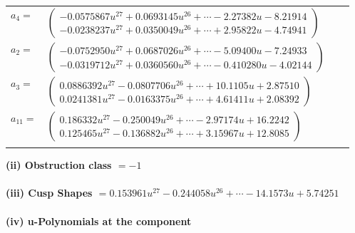 \documentclass[1p]{elsarticle_modified}
\theoremstyle{definition}
\begin{document}
\begin{tabular}{m{7pt} m{180pt} m{7pt} m{180pt} }
\flushright $a_{4}=$&$\begin{pmatrix}-0.0575867 u^{27}+0.0693145 u^{26}+\cdots-2.27382 u-8.21914\\-0.0238237 u^{27}+0.0350049 u^{26}+\cdots+2.95822 u-4.74941\end{pmatrix}$ \\
\flushright $a_{2}=$&$\begin{pmatrix}-0.0752950 u^{27}+0.0687026 u^{26}+\cdots-5.09400 u-7.24933\\-0.0319712 u^{27}+0.0360560 u^{26}+\cdots-0.410280 u-4.02144\end{pmatrix}$ \\
\flushright $a_{3}=$&$\begin{pmatrix}0.0886392 u^{27}-0.0807706 u^{26}+\cdots+10.1105 u+2.87510\\0.0241381 u^{27}-0.0163375 u^{26}+\cdots+4.61411 u+2.08392\end{pmatrix}$ \\
\flushright $a_{11}=$&$\begin{pmatrix}0.186332 u^{27}-0.250049 u^{26}+\cdots-2.97174 u+16.2242\\0.125465 u^{27}-0.136882 u^{26}+\cdots+3.15967 u+12.8085\end{pmatrix}$\\&\end{tabular}
\flushleft \textbf{(ii) Obstruction class $= -1$}\\~\\
\flushleft \textbf{(iii) Cusp Shapes $= 0.153961 u^{27}-0.244058 u^{26}+\cdots-14.1573 u+5.74251$}\\~\\
\newpage\renewcommand{\arraystretch}{1}
\flushleft \textbf{(iv) u-Polynomials at the component}\newline \\
\end{document}
